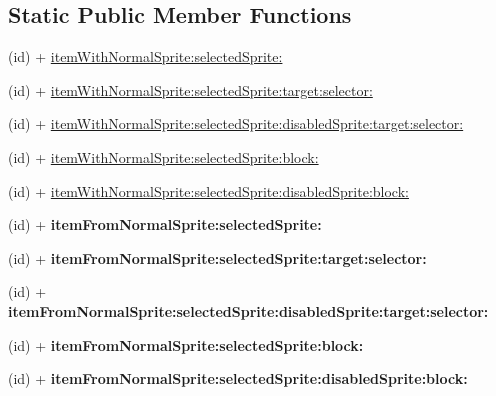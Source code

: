 \subsection*{Static Public Member Functions}
\begin{DoxyCompactItemize}
\item 
(id) + \hyperlink{class_c_c_menu_item_sprite_a3dfcb650ebf5c706ade2a79774d1afcf}{item\-With\-Normal\-Sprite\-:selected\-Sprite\-:}
\item 
(id) + \hyperlink{class_c_c_menu_item_sprite_a4f5d33dabb4c009756d8c2d7d74e547f}{item\-With\-Normal\-Sprite\-:selected\-Sprite\-:target\-:selector\-:}
\item 
(id) + \hyperlink{class_c_c_menu_item_sprite_af8cd62d76ab96244e2bf1445571497df}{item\-With\-Normal\-Sprite\-:selected\-Sprite\-:disabled\-Sprite\-:target\-:selector\-:}
\item 
(id) + \hyperlink{class_c_c_menu_item_sprite_a27560f01486fd5e874c29e1725d9e0ab}{item\-With\-Normal\-Sprite\-:selected\-Sprite\-:block\-:}
\item 
(id) + \hyperlink{class_c_c_menu_item_sprite_aec29d51438db0239ca3c8a35c51111c2}{item\-With\-Normal\-Sprite\-:selected\-Sprite\-:disabled\-Sprite\-:block\-:}
\item 
\hypertarget{class_c_c_menu_item_sprite_aab30fabf1443a8caa9c94f223f1bbbb3}{(id) + {\bfseries item\-From\-Normal\-Sprite\-:selected\-Sprite\-:}}\label{class_c_c_menu_item_sprite_aab30fabf1443a8caa9c94f223f1bbbb3}

\item 
\hypertarget{class_c_c_menu_item_sprite_a91888c28d0b6b51f0cd26102f6c54168}{(id) + {\bfseries item\-From\-Normal\-Sprite\-:selected\-Sprite\-:target\-:selector\-:}}\label{class_c_c_menu_item_sprite_a91888c28d0b6b51f0cd26102f6c54168}

\item 
\hypertarget{class_c_c_menu_item_sprite_a5d687ea03c1c3ecab951f3ba70d2b301}{(id) + {\bfseries item\-From\-Normal\-Sprite\-:selected\-Sprite\-:disabled\-Sprite\-:target\-:selector\-:}}\label{class_c_c_menu_item_sprite_a5d687ea03c1c3ecab951f3ba70d2b301}

\item 
\hypertarget{class_c_c_menu_item_sprite_a34b20b99fe1370dfc38abe2eafb15fe1}{(id) + {\bfseries item\-From\-Normal\-Sprite\-:selected\-Sprite\-:block\-:}}\label{class_c_c_menu_item_sprite_a34b20b99fe1370dfc38abe2eafb15fe1}

\item 
\hypertarget{class_c_c_menu_item_sprite_aea72fb7e424afd0ceb0d4c55b9377992}{(id) + {\bfseries item\-From\-Normal\-Sprite\-:selected\-Sprite\-:disabled\-Sprite\-:block\-:}}\label{class_c_c_menu_item_sprite_aea72fb7e424afd0ceb0d4c55b9377992}

\end{DoxyCompactItemize}
